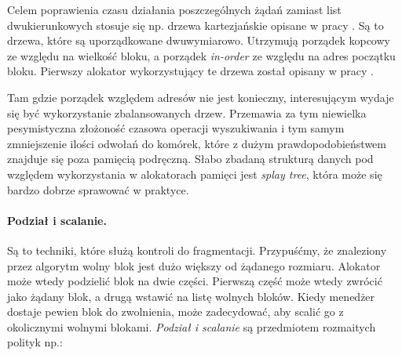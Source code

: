 \documentclass[12pt,a4paper,titlepage,twoside]{mwart}
\begin{document}
Celem poprawienia czasu działania poszczególnych żądań zamiast list
dwukierunkowych stosuje się np. drzewa kartezjańskie opisane w pracy
\cite{vuillemin80unifying}. Są to drzewa, które są uporządkowane dwuwymiarowo.
Utrzymują porządek kopcowy ze względu na wielkość bloku, a porządek
\textit{in-order} ze względu na adres początku bloku. Pierwszy alokator
wykorzystujący te drzewa został opisany w pracy \cite{stephenson83fastfits}.

Tam gdzie porządek względem adresów nie jest konieczny, interesującym wydaje
się być wykorzystanie zbalansowanych drzew. Przemawia za tym niewielka
pesymistyczna złożoność czasowa operacji wyszukiwania i tym samym zmniejszenie
ilości odwołań do komórek, które z dużym prawdopodobieństwem znajduje się poza
pamięcią podręczną. Słabo zbadaną strukturą danych pod względem wykorzystania w
alokatorach pamięci jest \textit{splay tree}, która może się bardzo dobrze
sprawować w praktyce.

\paragraph{Podział i scalanie.} Są to techniki, które służą kontroli do
fragmentacji. Przypuśćmy, że znaleziony przez algorytm wolny blok jest dużo
większy od żądanego rozmiaru. Alokator może wtedy podzielić blok na dwie
części. Pierwszą część może wtedy zwrócić jako żądany blok, a drugą wstawić na
listę wolnych bloków. Kiedy menedżer dostaje pewien blok do zwolnienia, może
zadecydować, aby scalić go z okolicznymi wolnymi blokami. \textit{Podział i
scalanie} są przedmiotem rozmaitych polityk np.:

\vspace{-1ex}
\end{document}
